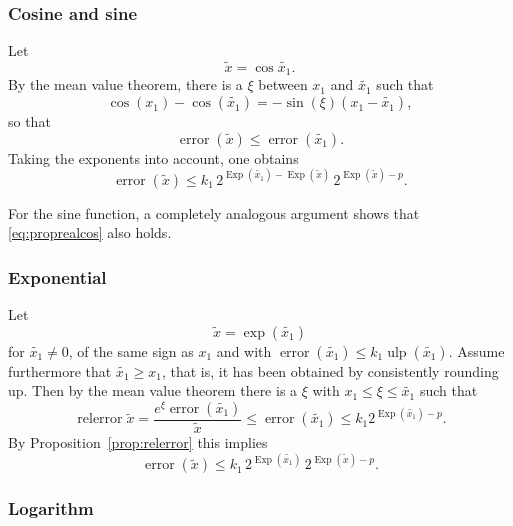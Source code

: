 \documentclass [11pt]{article}
\newcommand {\corr}[1]{{#1}}
\newcommand {\appro}[1]{\widetilde {#1}}
\newcommand {\Ulp}{{\operatorname {ulp}}}
\DeclareMathOperator{\Exp}{\operatorname {Exp}}
\newcommand{\error}{\operatorname {error}}
\newcommand{\relerror}{\operatorname {relerror}}
\renewcommand {\leq}{\leqslant}
\renewcommand {\geq}{\geqslant}
\begin{document}
\subsubsection {Cosine and sine}
\label {sssec:proprealcossin}

Let
\[
\appro x = \cos {\appro {x_1}}.
\]
By the mean value theorem, there is a $\xi$ between $x_1$ and $\appro {x_1}$
such that
\[
\cos (x_1) - \cos (\appro {x_1}) = -\sin (\xi) (x_1 - \appro {x_1}),
\]
so that
\[
\error (\appro x)
\leq \error (\appro {x_1}).
\]
Taking the exponents into account, one obtains
\begin {equation}
\label {eq:proprealcos}
\error (\appro x)
\leq
k_1 \, 2^{\Exp (\appro {x_1}) - \Exp (\appro x)}
\, 2^{\Exp (\appro x) - p}.
\end {equation}

For the sine function, a completely analogous argument shows that
\eqref {eq:proprealcos} also holds.


\subsubsection {Exponential}
\label {sssec:proprealexp}

Let
\[
\appro x = \exp (\appro {x_1})
\]
for $\appro {x_1} \neq 0$, of the same sign as $\corr {x_1}$ and  with
$\error (\appro {x_1}) \leq k_1 \Ulp (\appro {x_1})$.
Assume furthermore that $\appro {x_1} \geq \corr {x_1}$, that is, it has
been obtained by consistently rounding up.
Then by the mean value theorem there is a $\xi$ with
$\corr {x_1} \leq \xi \leq \appro {x_1}$ such that
\[
\relerror {\appro x}
= \frac {e^\xi \error (\appro {x_1})}{\appro x}
\leq \error (\appro {x_1})
\leq k_1 2^{\Exp (\appro {x_1}) - p}.
\]
By Proposition~\ref {prop:relerror} this implies
\begin {equation}
\label {eq:proprealexp}
\error (\appro x)
\leq k_1 \, 2^{\Exp (\appro {x_1})} \, 2^{\Exp (\appro x) - p}.
\end {equation}


\subsubsection {Logarithm}
\label {sssec:propreallog}
\end{document}
